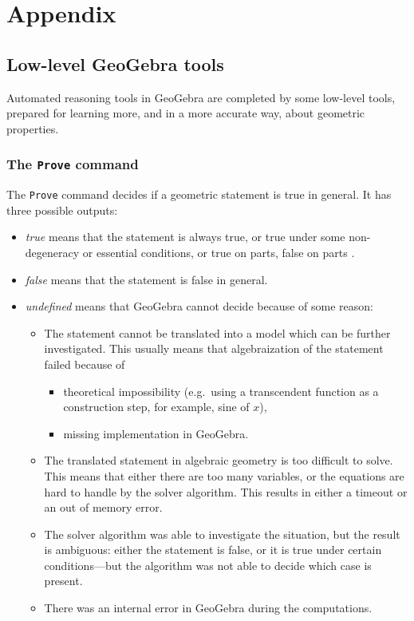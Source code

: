 \documentclass{article}
\begin{document}
\section{Appendix}
\label{sec:Appendix}
\subsection{Low-level GeoGebra tools}

Automated reasoning tools in GeoGebra are completed by some low-level tools,  prepared for learning more,  and in a more accurate way,  about geometric properties.

\subsubsection{The \texttt{Prove} command}
The \texttt{Prove} command decides if a geometric statement is true in general. It has three possible outputs:
\begin{itemize}
    \item \textit{true} means that the statement is always true, or true under some non-degeneracy \cite{Chou,CoxLittleOShea,RecioVelez} or essential \cite{KovacsRecioSolyomGecse} conditions, or true on parts, false on parts 
\cite{BotanaRecio2016,KovacsRecioVelez}.
    \item \textit{false} means that the statement is false in general.
    \item \textit{undefined} means that GeoGebra cannot decide because of some reason:
    \begin{itemize}
        \item The statement cannot be translated into a model which can be further investigated. This usually means that algebraization of the statement failed because of 
        \begin{itemize}
            \item theoretical impossibility (e.g.~using a transcendent function as a construction step, for example, sine of $x$),
            \item missing implementation in GeoGebra.
        \end{itemize}
        \item The translated statement in algebraic geometry is too difficult to solve. This means that either there are too many variables, or the equations are hard to handle by the solver algorithm. This results in either a timeout or an out of memory error.
        \item The solver algorithm was able to investigate the situation, but the result is ambiguous: either the statement is false, or it is true under certain conditions---but the algorithm was not able to decide which case is present.
        \item There was an internal error in GeoGebra during the computations.
    \end{itemize}
\end{itemize}
\end{document}

